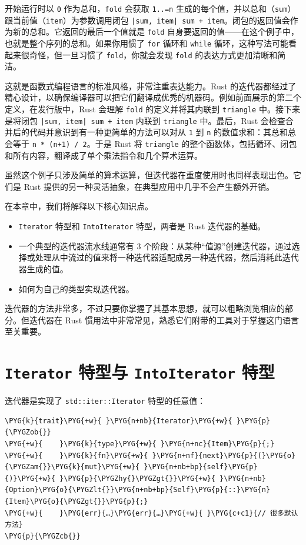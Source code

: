 开始运行时以 \texttt{0} 作为总和，\texttt{fold} 会获取 \texttt{1..=n} 生成的每个值，并以总和（\texttt{sum}）跟当前值（\texttt{item}）为参数调用闭包 \texttt{|sum, item| sum + item}。闭包的返回值会作为新的总和。它返回的最后一个值就是 \texttt{fold} 自身要返回的值——在这个例子中，也就是整个序列的总和。如果你用惯了 \texttt{for} 循环和 \texttt{while} 循环，这种写法可能看起来很奇怪，但一旦习惯了 \texttt{fold}，你就会发现 \texttt{fold} 的表达方式更加清晰和简洁。

这就是函数式编程语言的标准风格，非常注重表达能力。Rust 的迭代器都经过了精心设计，以确保编译器可以把它们翻译成优秀的机器码。例如前面展示的第二个定义，在发行版中，Rust 会理解 \texttt{fold} 的定义并将其内联到 \texttt{triangle} 中。接下来是将闭包 \texttt{|sum, item| sum + item} 内联到 \texttt{triangle} 中。最后，Rust 会检查合并后的代码并意识到有一种更简单的方法可以对从 \texttt{1} 到 \texttt{n} 的数值求和：其总和总会等于 \texttt{n * (n+1) / 2}。于是 Rust 将 \texttt{triangle} 的整个函数体，包括循环、闭包和所有内容，翻译成了单个乘法指令和几个算术运算。

虽然这个例子只涉及简单的算术运算，但迭代器在重度使用时也同样表现出色。它们是 Rust 提供的另一种灵活抽象，在典型应用中几乎不会产生额外开销。

在本章中，我们将解释以下核心知识点。

\begin{itemize}
\item \texttt{Iterator} 特型和 \texttt{IntoIterator} 特型，两者是 Rust 迭代器的基础。
\item 一个典型的迭代器流水线通常有 3 个阶段：从某种“值源”创建迭代器，通过选择或处理从中流过的值来将一种迭代器适配成另一种迭代器，然后消耗此迭代器生成的值。
\item 如何为自己的类型实现迭代器。
\end{itemize}

迭代器的方法非常多，不过只要你掌握了其基本思想，就可以粗略浏览相应的部分。但迭代器在 Rust 惯用法中非常常见，熟悉它们附带的工具对于掌握这门语言至关重要。

\section{\texttt{Iterator} 特型与 \texttt{IntoIterator} 特型}

迭代器是实现了 \texttt{std::iter::Iterator} 特型的任意值：

\begin{Verbatim}[commandchars=\\\{\},breaklines=true,breakanywhere=true,fontsize=\codefont,xleftmargin=17bp]
\PYG{k}{trait}\PYG{+w}{ }\PYG{n+nb}{Iterator}\PYG{+w}{ }\PYG{p}{\PYGZob{}}
\PYG{+w}{    }\PYG{k}{type}\PYG{+w}{ }\PYG{n+nc}{Item}\PYG{p}{;}
\PYG{+w}{    }\PYG{k}{fn}\PYG{+w}{ }\PYG{n+nf}{next}\PYG{p}{(}\PYG{o}{\PYGZam{}}\PYG{k}{mut}\PYG{+w}{ }\PYG{n+nb+bp}{self}\PYG{p}{)}\PYG{+w}{ }\PYG{p}{\PYGZhy{}\PYGZgt{}}\PYG{+w}{ }\PYG{n+nb}{Option}\PYG{o}{\PYGZlt{}}\PYG{n+nb+bp}{Self}\PYG{p}{::}\PYG{n}{Item}\PYG{o}{\PYGZgt{}}\PYG{p}{;}
\PYG{+w}{    }\PYG{err}{…}\PYG{err}{…}\PYG{+w}{ }\PYG{c+c1}{// 很多默认方法}
\PYG{p}{\PYGZcb{}}
\end{Verbatim}

